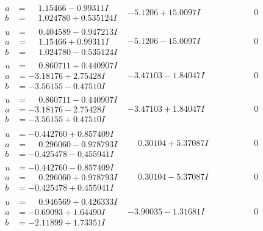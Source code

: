 \documentclass[1p]{elsarticle_modified}
\theoremstyle{definition}
\begin{document}
$$\begin{array}{c|c|c}
\begin{aligned}
a &= \phantom{-}1.15466 - 0.99311 I \\
b &= \phantom{-}1.024780 + 0.535124 I\end{aligned}
 & -5.1206 + 15.0097 I & \phantom{-0.000000 } 0 \\ \hline\begin{aligned}
u &= \phantom{-}0.404589 - 0.947213 I \\
a &= \phantom{-}1.15466 + 0.99311 I \\
b &= \phantom{-}1.024780 - 0.535124 I\end{aligned}
 & -5.1206 - 15.0097 I & \phantom{-0.000000 } 0 \\ \hline\begin{aligned}
u &= \phantom{-}0.860711 + 0.440907 I \\
a &= -3.18176 + 2.75428 I \\
b &= -3.56155 - 0.47510 I\end{aligned}
 & -3.47103 - 1.84047 I & \phantom{-0.000000 } 0 \\ \hline\begin{aligned}
u &= \phantom{-}0.860711 - 0.440907 I \\
a &= -3.18176 - 2.75428 I \\
b &= -3.56155 + 0.47510 I\end{aligned}
 & -3.47103 + 1.84047 I & \phantom{-0.000000 } 0 \\ \hline\begin{aligned}
u &= -0.442760 + 0.857409 I \\
a &= \phantom{-}0.296060 - 0.978793 I \\
b &= -0.425478 - 0.455941 I\end{aligned}
 & \phantom{-}0.30104 + 5.37087 I & \phantom{-0.000000 } 0 \\ \hline\begin{aligned}
u &= -0.442760 - 0.857409 I \\
a &= \phantom{-}0.296060 + 0.978793 I \\
b &= -0.425478 + 0.455941 I\end{aligned}
 & \phantom{-}0.30104 - 5.37087 I & \phantom{-0.000000 } 0 \\ \hline\begin{aligned}
u &= \phantom{-}0.946569 + 0.426333 I \\
a &= -0.69093 + 1.64490 I \\
b &= -2.11899 + 1.73351 I\end{aligned}
 & -3.90035 - 1.31681 I & \phantom{-0.000000 } 0 \\ \hline\begin{aligned}

\end{aligned}
\end{array}$$
\end{document}
